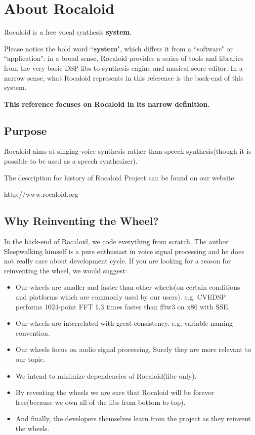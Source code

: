 \section{About Rocaloid}\indent

        Rocaloid is a free vocal synthesis \textbf{system}.
        
        Please notice the bold word ``\textbf{system}", which differs it from a ``software" or ``application": in a broad sense, Rocaloid provides a series of tools and libraries from the very basic DSP libs to synthesis engine and musical score editor. In a narrow sense, what Rocaloid represents in this reference is the back-end of this system.
        
        \bigskip
        
        \textbf{This reference focuses on Rocaloid in its narrow definition.}
        
        \bigskip

\subsection{Purpose}\indent

        Rocaloid aims at singing voice synthesis rather than speech synthesis(though it is possible to be used as a speech synthesizer).
        
        The description for history of Rocaloid Project can be found on our website:
        
        http://www.rocaloid.org
        
\subsection{Why Reinventing the Wheel?}\indent

        In the back-end of Rocaloid, we code everything from scratch. The author Sleepwalking himself is a pure enthusiast in voice signal processing and he does not really care about development cycle. If you are looking for a reason for reinventing the wheel, we would suggest:
        
        \begin{itemize}
                \item Our wheels are smaller and faster than other wheels(on certain conditions and platforms which are commonly used by our users). e.g. CVEDSP performs 1024-point FFT 1.3 times faster than fftw3 on x86 with SSE.
                \item Our wheels are interrelated with great consistency. e.g. variable naming convention.
                \item Our wheels focus on audio signal processing. Surely they are more relevant to our topic.
                \item We intend to minimize dependencies of Rocaloid(libc only).
                \item By reventing the wheels we are sure that Rocaloid will be forever free(because we own all of the libs from bottom to top).
                \item And finally, the developers themselves learn from the project as they reinvent the wheels.
        \end{itemize}

